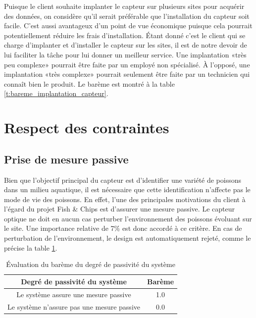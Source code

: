 Puisque le client souhaite implanter le capteur sur plusieurs sites pour acquérir des données, on considère qu'il serait préférable que l'installation du capteur soit facile. C'est aussi avantageux d'un point de vue économique puisque cela pourrait potentiellement réduire les frais d'installation. Étant donné c'est le client qui se charge d'implanter et d'installer le capteur sur les sites, il est de notre devoir de lui faciliter la tâche pour lui donner un meilleur service. Une implantation «très peu complexe» pourrait être faite par un employé non spécialisé. À l'opposé, une implantation «très complexe»  pourrait seulement être faite par un technicien qui connaît bien le produit. Le barème est montré à la table \ref{t:bareme_implantation_capteur}.

\section{Respect des contraintes}

\subsection{Prise de mesure passive}

Bien que l'objectif principal du capteur est d'identifier une variété de poissons dans un milieu aquatique, il est nécessaire que cette identification n'affecte pas le mode de vie des poissons. En effet, l'une des principales motivations du client à l'égard du projet Fish \& Chips est d'assurer une mesure passive. Le capteur optique ne doit en aucun cas perturber l'environnement des poissons évoluant sur le site. Une importance relative de 7\% est donc accordé à ce critère. En cas de perturbation de l'environnement, le design est automatiquement rejeté, comme le précise la table \ref{t:bareme_systeme_passif}. 

\begin{table}[htp]
   \footnotesize
   \centering
   \begin{tabular}{|c|c|}
        \hline
        Degré de passivité du système & Barème\\
        \hline
        \hline
        Le système assure une mesure passive & 1.0 \\
        \hline
        Le système n'assure pas une mesure passive & 0.0 \\
        \hline
   \end{tabular}
   \caption{Évaluation du barème du degré de passivité du système}
   \label{t:bareme_systeme_passif}
\end{table}


